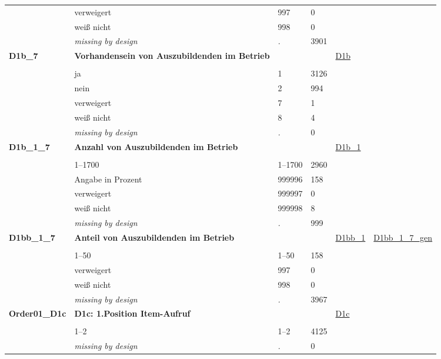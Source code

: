 \begin{longtable}{| L{2.45cm} | L{6cm} | C{1.5cm} | R{1cm} | C{2.25cm} | C{2.25cm} |}
   & verweigert & 997 & 0 &  &  \\ 
   & weiß nicht & 998 & 0 &  &  \\ 
   & \textit{missing by design} & \textit{.} & 3901 &  &  \\ 
   \midrule
\textbf{D1b\_7}\label{var:D1b:7} & \textbf{Vorhandensein von Auszubildenden im Betrieb} &  &  & \hyperref[D1b]{D1b} & \hyperref[var:suf:]{} \\ 
   &  &  &  &  &  \\ 
   & ja & 1 & 3126 &  &  \\ 
   & nein & 2 & 994 &  &  \\ 
   & verweigert & 7 & 1 &  &  \\ 
   & weiß nicht & 8 & 4 &  &  \\ 
   & \textit{missing by design} & \textit{.} & 0 &  &  \\ 
   \midrule
\textbf{D1b\_1\_7}\label{var:D1b:1:7} & \textbf{Anzahl von Auszubildenden im Betrieb} &  &  & \hyperref[D1b:1]{D1b\_1} & \hyperref[var:suf:]{} \\ 
   &  &  &  &  &  \\ 
   & 1--1700 & 1--1700 & 2960 &  &  \\ 
   & Angabe in Prozent & 999996 & 158 &  &  \\ 
   & verweigert & 999997 & 0 &  &  \\ 
   & weiß nicht & 999998 & 8 &  &  \\ 
   & \textit{missing by design} & \textit{.} & 999 &  &  \\ 
   \midrule
\textbf{D1bb\_1\_7}\label{var:D1bb:1:7} & \textbf{Anteil von Auszubildenden im Betrieb} &  &  & \hyperref[D1bb:1]{D1bb\_1} & \hyperref[var:suf:D1bb:1:7:gen]{D1bb\_1\_7\_gen} \\ 
   &  &  &  &  &  \\ 
   & 1--50 & 1--50 & 158 &  &  \\ 
   & verweigert & 997 & 0 &  &  \\ 
   & weiß nicht & 998 & 0 &  &  \\ 
   & \textit{missing by design} & \textit{.} & 3967 &  &  \\ 
   \midrule
\textbf{Order01\_D1c}\label{var:Order01:D1c} & \textbf{D1c: 1.Position Item-Aufruf} &  &  & \hyperref[D1c]{D1c} & \hyperref[var:suf:]{} \\ 
   &  &  &  &  &  \\ 
   & 1--2 & 1--2 & 4125 &  &  \\ 
   & \textit{missing by design} & \textit{.} & 0 &  &  \\ 

\end{longtable}
